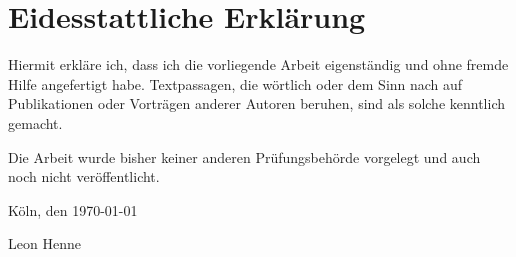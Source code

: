 \section*{Eidesstattliche Erklärung}

Hiermit erkläre ich, dass ich die vorliegende Arbeit eigenständig und ohne fremde Hilfe angefertigt habe. Textpassagen, die wörtlich oder dem Sinn nach auf Publikationen oder Vorträgen anderer Autoren beruhen, sind als solche kenntlich gemacht.

Die Arbeit wurde bisher keiner anderen Prüfungsbehörde vorgelegt und auch noch nicht veröffentlicht. \newline

Köln, den \today

\vspace{15mm}

Leon Henne

